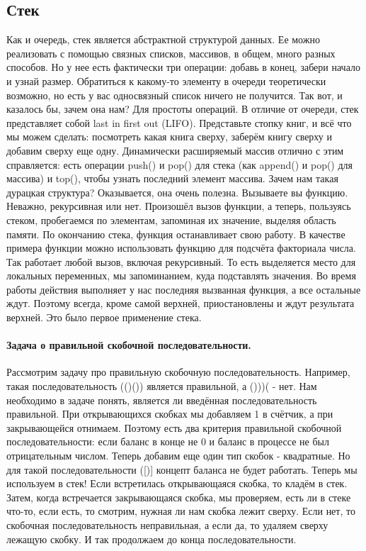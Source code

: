 \documentclass[a4paper,12pt]{article}
\begin{document}
\subsection{Стек}
Как и очередь, стек является абстрактной структурой данных. Ее можно реализовать с помощью связных списков, массивов, в общем, много разных способов. Но у нее есть фактически три операции: добавь в конец, забери начало и узнай размер. Обратиться к какому-то элементу в очереди теоретически возможно, но есть у вас односвязный список ничего не получится. Так вот, и казалось бы, зачем она нам? Для простоты операций. В отличие от очереди, стек представляет собой last in first out (LIFO). Представьте стопку книг, и всё что мы можем сделать: посмотреть какая книга сверху, заберём книгу сверху и добавим сверху еще одну. Динамически расширяемый массив отлично с этим справляется: есть операции push() и pop() для стека (как append() и pop() для массива) и top(), чтобы узнать последний элемент массива. Зачем нам такая дурацкая структура? Оказывается, она очень полезна. Вызываете вы функцию. Неважно, рекурсивная или нет. Произошёл вызов функции, а теперь, пользуясь стеком, пробегаемся по элементам, запоминая их значение, выделяя область памяти. По окончанию стека, функция останавливает свою работу. В качестве примера функции можно использовать функцию для подсчёта факториала числа. Так работает любой вызов, включая рекурсивный. То есть выделяется место для локальных переменных, мы запоминанием, куда подставлять значения. Во время работы действия выполняет у нас последняя вызванная функция, а все остальные ждут. Поэтому всегда, кроме самой верхней, приостановлены и ждут результата верхней. Это было первое применение стека.
\paragraph{Задача о правильной скобочной последовательности.}
Рассмотрим задачу про правильную скобочную последовательность. Например, такая последовательность (()()) является правильной, а ()))( - нет. Нам необходимо в задаче понять, является ли введённая последовательность правильной. При открывающихся скобках мы добавляем 1 в счётчик, а при закрывающейся отнимаем. Поэтому есть два критерия правильной скобочной последовательности: если баланс в конце не 0 и баланс в процессе не был отрицательным числом. Теперь добавим еще один тип скобок - квадратные. Но для такой последовательности ([)] концепт баланса не будет работать. Теперь мы используем в стек! Если встретилась открывающаяся скобка, то кладём в стек. Затем, когда встречается закрывающаяся скобка, мы проверяем, есть ли в стеке что-то, если есть, то смотрим, нужная ли нам скобка лежит сверху. Если нет, то скобочная последовательность неправильная, а если да, то удаляем сверху лежащую скобку. И так продолжаем до конца последовательности.
\end{document}
